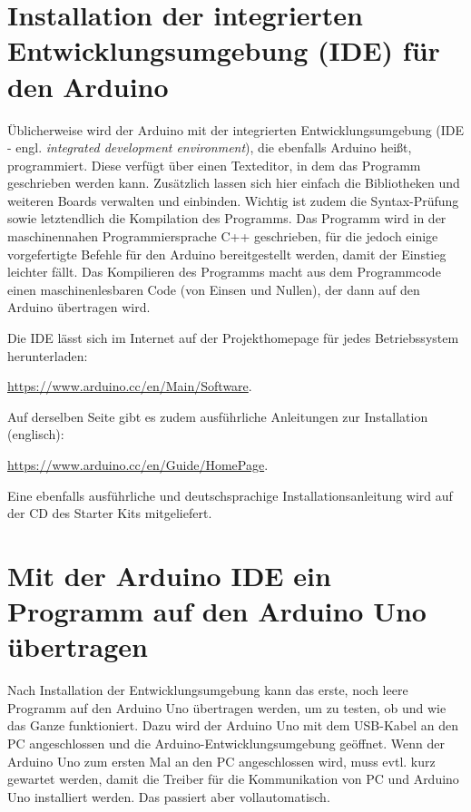 \section{Installation der integrierten Entwicklungsumgebung (IDE) für den Arduino}
\label{sec:install_ide}

Üblicherweise wird der Arduino mit der integrierten Entwicklungsumgebung (IDE - engl. \emph{integrated development environment}), die ebenfalls Arduino heißt, programmiert. Diese verfügt über einen Texteditor, in dem das Programm geschrieben werden kann. Zusätzlich lassen sich hier einfach die Bibliotheken und weiteren Boards verwalten und einbinden. Wichtig ist zudem die Syntax-Prüfung sowie letztendlich die Kompilation des Programms. Das Programm wird in der maschinennahen Programmiersprache C++ geschrieben, für die jedoch einige vorgefertigte Befehle für den Arduino bereitgestellt werden, damit der Einstieg leichter fällt. Das Kompilieren des Programms macht aus dem Programmcode einen maschinenlesbaren Code (von Einsen und Nullen), der dann auf den Arduino übertragen wird.

Die IDE lässt sich im Internet auf der Projekthomepage für jedes Betriebssystem herunterladen:

\url{https://www.arduino.cc/en/Main/Software}.

Auf derselben Seite gibt es zudem ausführliche Anleitungen zur Installation (englisch):

\url{https://www.arduino.cc/en/Guide/HomePage}.

Eine ebenfalls ausführliche und deutschsprachige Installationsanleitung wird auf der CD des Starter Kits mitgeliefert.

\section{Mit der Arduino IDE ein Programm auf den Arduino Uno übertragen}
\label{sec:program_ide}

Nach Installation der Entwicklungsumgebung kann das erste, noch leere Programm auf den Arduino Uno übertragen werden, um zu testen, ob und wie das Ganze funktioniert. Dazu wird der Arduino Uno mit dem USB-Kabel an den PC angeschlossen und die Arduino-Entwicklungsumgebung geöffnet. Wenn der Arduino Uno zum ersten Mal an den PC angeschlossen wird, muss evtl. kurz gewartet werden, damit die Treiber für die Kommunikation von PC und Arduino Uno installiert werden. Das passiert aber vollautomatisch.

